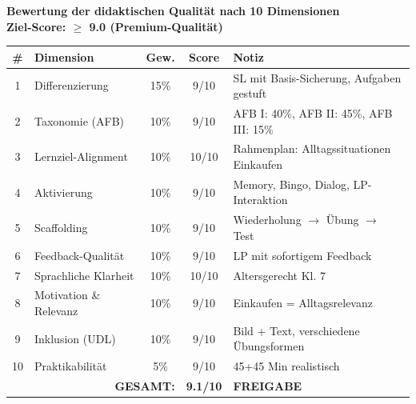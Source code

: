 \documentclass[11pt,a4paper]{article}
\begin{document}
\begin{scorebox}
\textbf{Bewertung der didaktischen Qualität nach 10 Dimensionen}\\
\textbf{Ziel-Score: $\geq$ 9.0 (Premium-Qualität)}

\vspace{1em}
\begin{tabular}{|c|l|c|c|p{4.5cm}|}
\hline
\textbf{\#} & \textbf{Dimension} & \textbf{Gew.} & \textbf{Score} & \textbf{Notiz} \\
\hline
1 & Differenzierung & 15\% & 9/10 & SL mit Basis-Sicherung, Aufgaben gestuft \\
\hline
2 & Taxonomie (AFB) & 10\% & 9/10 & AFB I: 40\%, AFB II: 45\%, AFB III: 15\% \\
\hline
3 & Lernziel-Alignment & 10\% & 10/10 & Rahmenplan: Alltagssituationen Einkaufen \\
\hline
4 & Aktivierung & 10\% & 9/10 & Memory, Bingo, Dialog, LP-Interaktion \\
\hline
5 & Scaffolding & 10\% & 9/10 & Wiederholung $\rightarrow$ Übung $\rightarrow$ Test \\
\hline
6 & Feedback-Qualität & 10\% & 9/10 & LP mit sofortigem Feedback \\
\hline
7 & Sprachliche Klarheit & 10\% & 10/10 & Altersgerecht Kl. 7 \\
\hline
8 & Motivation \& Relevanz & 10\% & 9/10 & Einkaufen = Alltagsrelevanz \\
\hline
9 & Inklusion (UDL) & 10\% & 9/10 & Bild + Text, verschiedene Übungsformen \\
\hline
10 & Praktikabilität & 5\% & 9/10 & 45+45 Min realistisch \\
\hline
\multicolumn{3}{|r|}{\textbf{GESAMT:}} & \textbf{9.1/10} & \textcolor{successgreen}{\textbf{FREIGABE}} \\
\hline
\end{tabular}
\end{scorebox}
\end{document}
